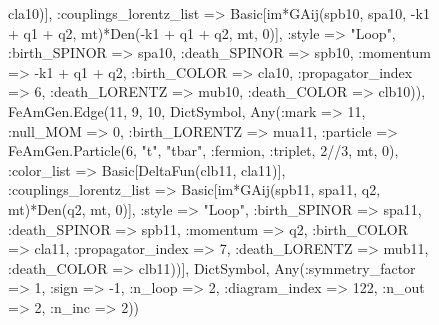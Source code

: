 \documentclass{revtex4}
\begin{document}
\begin{figure}[!htb]
\begin{center}
{cla10)], :couplings_lorentz_list => Basic[im*GAij(spb10, spa10, -k1 + q1 + q2, mt)*Den(-k1 + q1 + q2, mt, 0)], :style => "Loop", :birth_SPINOR => spa10, :death_SPINOR => spb10, :momentum => -k1 + q1 + q2, :birth_COLOR => cla10, :propagator_index => 6, :death_LORENTZ => mub10, :death_COLOR => clb10)), FeAmGen.Edge(11, 9, 10, Dict{Symbol, Any}(:mark => 11, :null_MOM => 0, :birth_LORENTZ => mua11, :particle => FeAmGen.Particle(6, "t", "tbar", :fermion, :triplet, 2//3, mt, 0), :color_list => Basic[DeltaFun(clb11, cla11)], :couplings_lorentz_list => Basic[im*GAij(spb11, spa11, q2, mt)*Den(q2, mt, 0)], :style => "Loop", :birth_SPINOR => spa11, :death_SPINOR => spb11, :momentum => q2, :birth_COLOR => cla11, :propagator_index => 7, :death_LORENTZ => mub11, :death_COLOR => clb11))], Dict{Symbol, Any}(:symmetry_factor => 1, :sign => -1, :n_loop => 2, :diagram_index => 122, :n_out => 2, :n_inc => 2)) 
}
\end{center}
\end{figure}
\end{document}
